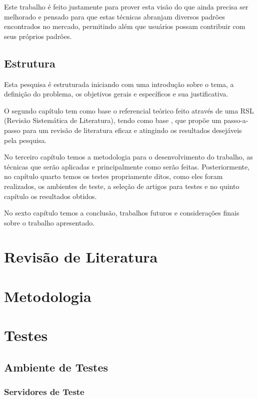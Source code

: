\documentclass[
	12pt,               %
	openright,          %
	twoside,            %
	a4paper,            %
	english,            %
	brazil              %
	]{abntex2}
\begin{document}
Este trabalho é feito justamente para prover esta visão do que ainda precisa ser melhorado e pensado para que estas técnicas abranjam diversos padrões encontrados no mercado, permitindo além que usuários possam contribuir com seus próprios padrões.

\section{Estrutura}

Esta pesquisa é estruturada iniciando com uma introdução sobre o tema, a definição do problema, os objetivos gerais e específicos e sua justificativa.

O segundo capítulo tem como base o referencial teórico feito através de uma RSL (Revisão Sistemática de Literatura), tendo como base \cite{rsl-manual}, que propõe um passo-a-passo para um revisão de literatura eficaz e atingindo os resultados desejáveis pela pesquisa.

No terceiro capítulo temos a metodologia para o desenvolvimento do trabalho, as técnicas que serão aplicadas e principalmente como serão feitas. Posteriormente, no capítulo quarto temos os testes propriamente ditos, como eles foram realizados, os ambientes de teste, a seleção de artigos para testes e no quinto capítulo os resultados obtidos.

No sexto capítulo temos a conclusão, trabalhos futuros e considerações finais sobre o trabalho apresentado.

\chapter{Revisão de Literatura}

\chapter{Metodologia}

\chapter{Testes}

\section{Ambiente de Testes}

\subsection{Servidores de Teste}
\end{document}
